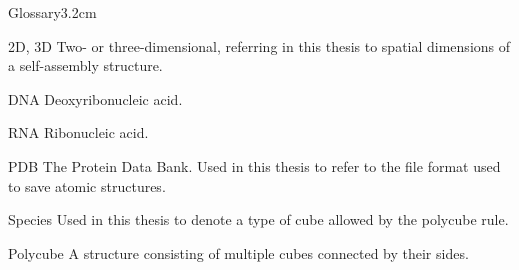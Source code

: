 \begin{mclistof}{Glossary}{3.2cm}

\item[2D, 3D] Two- or three-dimensional, referring in this thesis to spatial dimensions of a self-assembly structure.
\item[DNA] Deoxyribonucleic acid.
\item[RNA] Ribonucleic acid.
\item[PDB] The Protein Data Bank. Used in this thesis to refer to the file format used to save atomic structures.
\item[Species] Used in this thesis to denote a type of cube allowed by the polycube rule.
\item[Polycube] A structure consisting of multiple cubes connected by their sides.

\end{mclistof} 
